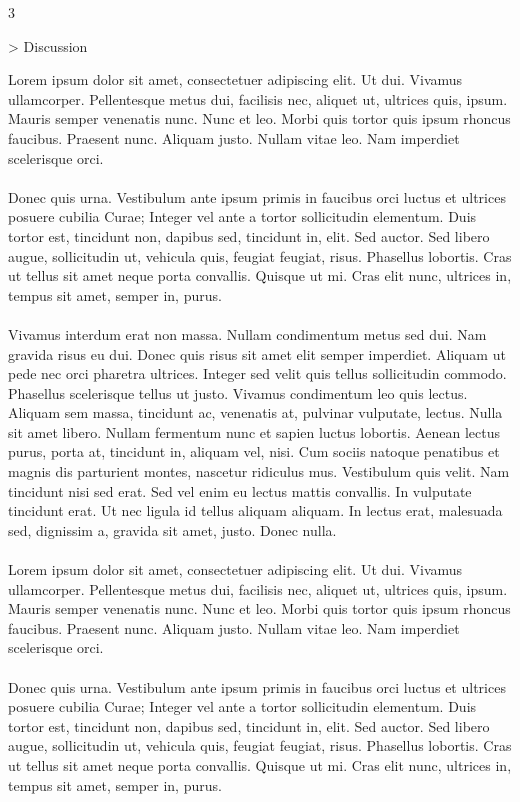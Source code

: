 \documentclass[a0,final]{a0poster}
\newenvironment{Section}[1]				%
{
\par 
\flushleft
\colorbox{boxcol}{%
\sffamily\large\color{headingcol}> \color{white} #1%
\hspace{0.5cm}}
\par\nobreak 
\nointerlineskip 						%
\setlength\parskip{-1pt}					%
\begin{lrbox}\envbox						%
\begin{minipage}{0.95\columnwidth}		%
}
{\par
\end{minipage}\end{lrbox}				%
\fcolorbox{boxcol}{fillcol}{\usebox\envbox}	%
\vspace{1cm}							%
}
\begin{document}
\begin{multicols}{3}
\begin{Section}{Discussion}
Lorem ipsum dolor sit amet, consectetuer adipiscing elit. Ut dui. Vivamus ullamcorper. Pellentesque metus dui, facilisis nec, aliquet ut, ultrices quis, ipsum. Mauris semper venenatis nunc. Nunc et leo. Morbi quis tortor quis ipsum rhoncus faucibus. Praesent nunc. Aliquam justo. Nullam vitae leo. Nam imperdiet scelerisque orci.\\
\\
Donec quis urna. Vestibulum ante ipsum primis in faucibus orci luctus et ultrices posuere cubilia Curae; Integer vel ante a tortor sollicitudin elementum. Duis tortor est, tincidunt non, dapibus sed, tincidunt in, elit. Sed auctor. Sed libero augue, sollicitudin ut, vehicula quis, feugiat feugiat, risus. Phasellus lobortis. Cras ut tellus sit amet neque porta convallis. Quisque ut mi. Cras elit nunc, ultrices in, tempus sit amet, semper in, purus.\\
\\
Vivamus interdum erat non massa. Nullam condimentum metus sed dui. Nam gravida risus eu dui. Donec quis risus sit amet elit semper imperdiet. Aliquam ut pede nec orci pharetra ultrices. Integer sed velit quis tellus sollicitudin commodo. Phasellus scelerisque tellus ut justo. Vivamus condimentum leo quis lectus. Aliquam sem massa, tincidunt ac, venenatis at, pulvinar vulputate, lectus. Nulla sit amet libero. Nullam fermentum nunc et sapien luctus lobortis. Aenean lectus purus, porta at, tincidunt in, aliquam vel, nisi. Cum sociis natoque penatibus et magnis dis parturient montes, nascetur ridiculus mus. Vestibulum quis velit. Nam tincidunt nisi sed erat. Sed vel enim eu lectus mattis convallis. In vulputate tincidunt erat. Ut nec ligula id tellus aliquam aliquam. In lectus erat, malesuada sed, dignissim a, gravida sit amet, justo. Donec nulla.\\
\\
Lorem ipsum dolor sit amet, consectetuer adipiscing elit. Ut dui. Vivamus ullamcorper. Pellentesque metus dui, facilisis nec, aliquet ut, ultrices quis, ipsum. Mauris semper venenatis nunc. Nunc et leo. Morbi quis tortor quis ipsum rhoncus faucibus. Praesent nunc. Aliquam justo. Nullam vitae leo. Nam imperdiet scelerisque orci.\\
\\
Donec quis urna. Vestibulum ante ipsum primis in faucibus orci luctus et ultrices posuere cubilia Curae; Integer vel ante a tortor sollicitudin elementum. Duis tortor est, tincidunt non, dapibus sed, tincidunt in, elit. Sed auctor. Sed libero augue, sollicitudin ut, vehicula quis, feugiat feugiat, risus. Phasellus lobortis. Cras ut tellus sit amet neque porta convallis. Quisque ut mi. Cras elit nunc, ultrices in, tempus sit amet, semper in, purus.\\

\end{Section}
\end{multicols}
\end{document}
